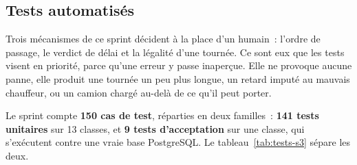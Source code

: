 \subsection{Tests automatisés}

Trois mécanismes de ce sprint décident à la place d'un humain~: l'ordre de passage, le verdict de
délai et la légalité d'une tournée. Ce sont eux que les tests visent en priorité, parce qu'une erreur
y passe inaperçue. Elle ne provoque aucune panne, elle produit une tournée un peu plus longue, un
retard imputé au mauvais chauffeur, ou un camion chargé au-delà de ce qu'il peut porter.

Le sprint compte \textbf{150 cas de test}, réparties en deux familles~: \textbf{141 tests
unitaires} sur 13 classes, et \textbf{9 tests d'acceptation} sur une classe, qui s'exécutent contre
une vraie base PostgreSQL. Le tableau~\ref{tab:tests-s3} sépare les deux.

